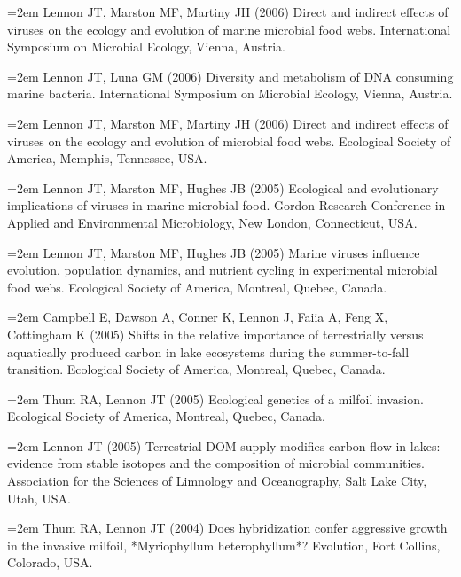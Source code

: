 \documentclass[11pt]{article}
\begin{document}
{\hangindent=2em Lennon JT, Marston MF, Martiny JH (2006) Direct and indirect effects of viruses on the ecology and evolution of marine microbial food webs. International Symposium on Microbial Ecology, Vienna, Austria. \par

\hangindent=2em Lennon JT, Luna GM (2006) Diversity and metabolism of DNA consuming marine bacteria. International Symposium on Microbial Ecology, Vienna, Austria. \par

\hangindent=2em Lennon JT, Marston MF, Martiny JH (2006) Direct and indirect effects of viruses on the ecology and evolution of microbial food webs. Ecological Society of America, Memphis, Tennessee, USA. \par

\hangindent=2em Lennon JT, Marston MF, Hughes JB (2005) Ecological and evolutionary implications of viruses in marine microbial food. Gordon Research Conference in Applied and Environmental Microbiology, New London, Connecticut, USA. \par

\hangindent=2em Lennon JT, Marston MF, Hughes JB (2005) Marine viruses influence evolution, population dynamics, and nutrient cycling in experimental microbial food webs. Ecological Society of America, Montreal, Quebec, Canada. \par

\hangindent=2em Campbell E, Dawson A, Conner K, Lennon J, Faiia A, Feng X, Cottingham K (2005) Shifts in the relative importance of terrestrially versus aquatically produced carbon in lake ecosystems during the summer-to-fall transition. Ecological Society of America, Montreal, Quebec, Canada. \par

\hangindent=2em Thum RA, Lennon JT (2005) Ecological genetics of a milfoil invasion. Ecological Society of America, Montreal, Quebec, Canada. \par

\hangindent=2em Lennon JT (2005) Terrestrial DOM supply modifies carbon flow in lakes: evidence from stable isotopes and the composition of microbial communities. Association for the Sciences of Limnology and Oceanography, Salt Lake City, Utah, USA. \par

\hangindent=2em Thum RA, Lennon JT (2004) Does hybridization confer aggressive growth in the invasive milfoil, *Myriophyllum heterophyllum*? Evolution, Fort Collins, Colorado, USA. \par

}
\end{document}
